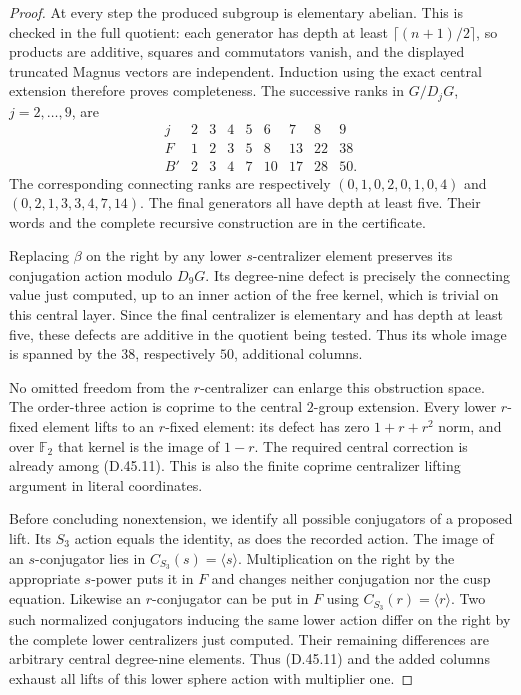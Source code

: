 \begin{proof}
At every step the produced
subgroup is elementary
abelian. This is checked
in the full quotient:
each generator has depth
at least \(\lceil(n+1)/2\rceil\),
so products are additive,
squares and commutators
vanish, and the displayed
truncated Magnus vectors
are independent. Induction
using the exact central
extension therefore proves
completeness. The successive
ranks in \(G/D_jG\),
\(j=2,\ldots,9\), are
\[
 \begin{array}{c|rrrrrrrr}
 j&2&3&4&5&6&7&8&9\\ \hline
 F&1&2&3&5&8&13&22&38\\
 B'&2&3&4&7&10&17&28&50 .
 \end{array}                                                   \tag{D.45.12}
\]
The corresponding connecting
ranks are respectively
\((0,1,0,2,0,1,0,4)\)
and \((0,2,1,3,3,4,7,14)\).
The final generators all
have depth at least five.
Their words and the complete
recursive construction
are in the certificate.

Replacing \(\beta\) on the
right by any lower
\(s\)-centralizer element
preserves its conjugation
action modulo \(D_9G\).
Its degree-nine defect
is precisely the connecting
value just computed, up
to an inner action of the
free kernel, which is
trivial on this central
layer. Since the final
centralizer is elementary
and has depth at least
five, these defects are
additive in the quotient
being tested. Thus its
whole image is spanned
by the \(38\), respectively
\(50\), additional columns.

No omitted freedom from
the \(r\)-centralizer can
enlarge this obstruction
space. The order-three
action is coprime to the
central \(2\)-group
extension. Every lower
\(r\)-fixed element lifts
to an \(r\)-fixed element:
its defect has zero
\(1+r+r^2\) norm, and
over \(\mathbb F_2\)
that kernel is the image
of \(1-r\). The required
central correction is
already among (D.45.11).
This is also the finite
coprime centralizer
lifting argument in
literal coordinates.

Before concluding
nonextension, we identify
all possible conjugators
of a proposed lift.
Its \(S_3\) action equals
the identity, as does
the recorded action.
The image of an
\(s\)-conjugator lies
in \(C_{S_3}(s)=\langle s\rangle\).
Multiplication on the
right by the appropriate
\(s\)-power puts it
in \(F\) and changes
neither conjugation
nor the cusp equation.
Likewise an
\(r\)-conjugator can
be put in \(F\) using
\(C_{S_3}(r)=\langle r\rangle\).
Two such normalized
conjugators inducing
the same lower action
differ on the right
by the complete lower
centralizers just
computed. Their
remaining differences
are arbitrary central
degree-nine elements.
Thus (D.45.11) and
the added columns
exhaust all lifts of
this lower sphere
action with multiplier
one.


\end{proof}
